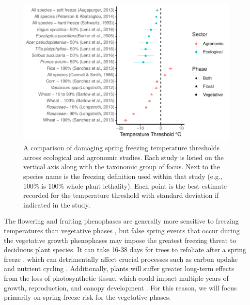 \documentclass{article}\usepackage[]{graphicx}\usepackage[]{color}
\makeatletter
\def\maxwidth{ %
  \ifdim\Gin@nat@width>\linewidth
    \linewidth
  \else
    \Gin@nat@width
  \fi
}
\makeatother
\begin{document}
\begin{figure}[H]

{\centering \includegraphics[width=\maxwidth]{figure/temp-1} 

}

\caption[A comparison of damaging spring freezing temperature thresholds across ecological and agronomic studies]{A comparison of damaging spring freezing temperature thresholds across ecological and agronomic studies. Each study is listed on the vertical axis along with the taxonomic group of focus. Next to the species name is the freezing definition used within that study (e.g., 100\% is 100\% whole plant lethality). Each point is the best estimate recorded for the temperature threshold with standard deviation if indicated in the study.}\label{fig:temp}
\end{figure}



The flowering and fruiting phenophases are generally more sensitive to freezing temperatures than vegetative phases \citep{Inouye2000, Augspurger2009, Caradonna2016, Lenz2013}, but false spring events that occur during the vegetative growth phenophases may impose the greatest freezing threat to deciduous plant species. It can take 16-38 days for trees to refoliate after a spring freeze \citep{Gu2008, Augspurger2009, Augspurger2013, Menzel2015}, which can detrimentally affect crucial processes such as carbon updake and nutrient cycling \citep{Hufkens2012, Richardson2013, Klosterman2018}. Additionally, plants will suffer greater long-term effects from the loss of photosynthetic tissue, which could impact multiple years of growth, reproduction, and canopy development \citep{Vitasse2014, Xie2015}.  For this reason, we will focus primarily on spring freeze risk for the vegetative phases.
\end{document}
